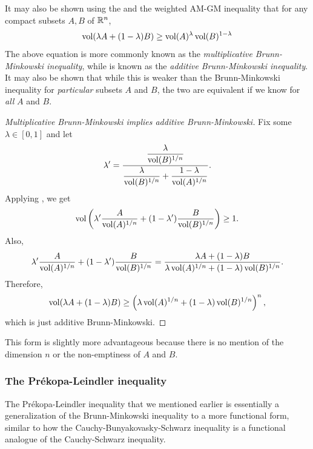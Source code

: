 It may also be shown using the  and the weighted AM-GM inequality that for any compact subsets $A,B$ of $\mathbb{R}^n$,
\begin{equation}
\label{eqn multiplicative brunn minkowski}
    \operatorname{vol}(\lambda A + (1-\lambda)B) \geq \operatorname{vol}(A)^{\lambda} \operatorname{vol}(B)^{1-\lambda}
\end{equation}
The above equation is more commonly known as the \textit{multiplicative Brunn-Minkowski inequality}, while  is known as the \textit{additive Brunn-Minkowski inequality}. It may also be shown that while this is weaker than the Brunn-Minkowski inequality for \textit{particular} subsets $A$ and $B$, the two are equivalent if we know  for \textit{all} $A$ and $B$.

\begin{proof}[Multiplicative Brunn-Minkowski implies additive Brunn-Minkowski]
Fix some $\lambda\in[0,1]$ and let
\[ \lambda' = \dfrac{\dfrac{\lambda}{\operatorname{vol}(B)^{1/n}}}{\dfrac{\lambda}{\operatorname{vol}(B)^{1/n}} + \dfrac{1-\lambda}{\operatorname{vol}(A)^{1/n}}}. \]
Applying , we get
\[ \operatorname{vol}\left(\lambda'\frac{A}{\operatorname{vol}(A)^{1/n}} + (1-\lambda')\frac{B}{\operatorname{vol}(B)^{1/n}}\right) \geq 1. \]
Also,
\[
    \lambda'\frac{A}{\operatorname{vol}(A)^{1/n}} + (1-\lambda')\frac{B}{\operatorname{vol}(B)^{1/n}} =  \frac{\lambda A + (1-\lambda)B}{\lambda\operatorname{vol}(A)^{1/n} + (1-\lambda)\operatorname{vol}(B)^{1/n}}.
\]
Therefore,
\[ \operatorname{vol}(\lambda A + (1-\lambda)B) \geq \left(\lambda\operatorname{vol}(A)^{1/n} + (1-\lambda)\operatorname{vol}(B)^{1/n}\right)^n, \]
which is just additive Brunn-Minkowski.
\end{proof}

This form is slightly more advantageous because there is no mention of the dimension $n$ or the non-emptiness of $A$ and $B$.

\subsubsection{The Pr\'{e}kopa-Leindler inequality}

The Pr\'{e}kopa-Leindler inequality that we mentioned earlier is essentially a generalization of the Brunn-Minkowski inequality to a more functional form, similar to how the Cauchy-Bunyakovasky-Schwarz inequality is a functional analogue of the Cauchy-Schwarz inequality.\\

